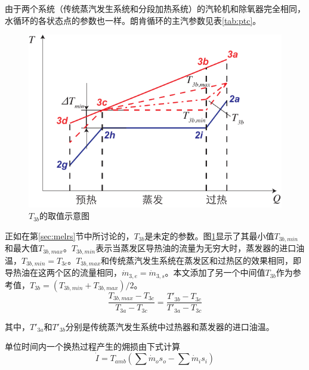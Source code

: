 由于两个系统（传统蒸汽发生系统和分段加热系统）的汽轮机和除氧器完全相同，水循环的各状态点的参数也一样。朗肯循环的主汽参数见表\ref{tab:ptc}。

\noindent \begin{figure}[htbp]
\begin{center}
	\includegraphics[width = 0.7\columnwidth]{fig/T3b}
	\caption{$T_{3b}$的取值示意图}
	\label{fig:T3b}
\end{center}
\end{figure}

正如在第\ref{sec:melrs}节中所讨论的，$T_{3b}$是未定的参数。图\ref{fig:T3b}显示了其最小值$T_{3b,min}$和最大值$T_{3b,max}$。$T_{3b,min}$表示当蒸发区导热油的流量为无穷大时，蒸发器的进口油温，$T_{3b,min} = T_{3c}$。$T_{3b,max}$和传统蒸汽发生系统在蒸发区和过热区的效果相同，即导热油在这两个区的流量相同，$\dot{m}_{3,e} = \dot{m}_{3,s}$。本文添加了另一个中间值$T_{3b}$作为参考值，$T_{3b} = (T_{3b,min} + T_{3b,max}) / 2$。
\begin{equation}
  \dfrac{T_{3b,max}-T_{3c}}{T_{3a} - T_{3c}} = \dfrac{T'_{3b} - T_{3c}}{T'_{3a} - T_{3c}}
\end{equation}

其中，$T'_{3a}$和$T'_{3b}$分别是传统蒸汽发生系统中过热器和蒸发器的进口油温。

单位时间内一个换热过程产生的㶲损由下式计算
\begin{equation}
  \dot{I} = T_{amb} (\sum \dot{m}_os_o - \sum \dot{m}_is_i)
  \label{eq:dot_I}
\end{equation}

